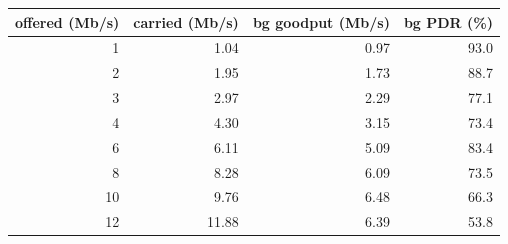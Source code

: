 \begin{tabular}{@{}rrrr@{}}\toprule
offered (Mb/s) & carried (Mb/s) & bg goodput (Mb/s) & bg PDR (\%)\\\midrule
1 & 1.04 & 0.97 & 93.0\\
2 & 1.95 & 1.73 & 88.7\\
3 & 2.97 & 2.29 & 77.1\\
4 & 4.30 & 3.15 & 73.4\\
6 & 6.11 & 5.09 & 83.4\\
8 & 8.28 & 6.09 & 73.5\\
10 & 9.76 & 6.48 & 66.3\\
12 & 11.88 & 6.39 & 53.8\\
\bottomrule\end{tabular}